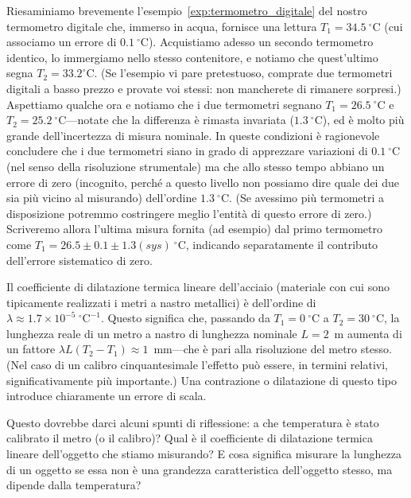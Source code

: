 \begin{examplebox}
  \begin{example}\label{exp:termometro_digitale_2}
    Riesaminiamo brevemente l'esempio~\ref{exp:termometro_digitale} del
    nostro termometro digitale che, immerso in acqua, fornisce una lettura
    $T_1 = 34.5~^\circ$C (cui associamo un errore di $0.1~^\circ$C). Acquistiamo
    adesso un secondo termometro identico, lo immergiamo nello stesso
    contenitore, e notiamo che quest'ultimo segna $T_2 = 33.2^\circ$C. (Se
    l'esempio vi pare pretestuoso, comprate due termometri digitali a basso
    prezzo e provate voi stessi: non mancherete di rimanere sorpresi.)
    Aspettiamo qualche ora e notiamo che i due termometri segnano
    $T_1 = 26.5~^\circ$C e $T_2 = 25.2~^\circ$C---notate che la differenza è
    rimasta invariata ($1.3~^\circ$C), ed è molto più grande dell'incertezza
    di misura nominale.
    In queste condizioni è ragionevole concludere che i due termometri siano
    in grado di apprezzare variazioni di $0.1~^\circ$C (nel senso della
    risoluzione strumentale) ma che allo stesso tempo abbiano un errore di zero
    (incognito, perché a questo livello non possiamo dire quale dei due sia
    più vicino al misurando) dell'ordine $1.3~^\circ$C.
    (Se avessimo più termometri a disposizione potremmo costringere meglio
    l'entità di questo errore di zero.) Scriveremo allora l'ultima misura
    fornita (ad esempio) dal primo termometro come
    $T_1 = 26.5 \pm 0.1 \pm 1.3 (sys)~^\circ$C, indicando separatamente il
    contributo dell'errore sistematico di zero.
  \end{example}

  \begin{example}\label{exp:dilatazione_termica}
    Il coefficiente di dilatazione termica lineare dell'acciaio (materiale con
    cui sono tipicamente realizzati i metri a nastro metallici) è dell'ordine
    di $\lambda \approx 1.7 \times 10^{-5}~{}^\circ\text{C}^{-1}$. Questo significa
    che, passando da $T_1 = 0~^\circ$C a $T_2 = 30~^\circ$C, la lunghezza
    reale di un metro a nastro di lunghezza nominale $L = 2$~m aumenta
    di un fattore $\lambda L (T_2 - T_1) \approx 1$~mm---che è pari alla
    risoluzione del metro stesso. (Nel caso di un calibro cinquantesimale
    l'effetto può essere, in termini relativi, significativamente più
    importante.) Una contrazione o dilatazione di questo tipo introduce
    chiaramente un errore di scala.

    Questo dovrebbe darci alcuni spunti di riflessione: a che temperatura è
    stato calibrato il metro (o il calibro)? Qual è il coefficiente di
    dilatazione termica lineare dell'oggetto che stiamo misurando? E cosa
    significa misurare la lunghezza di un oggetto se essa non è una grandezza
    caratteristica dell'oggetto stesso, ma dipende dalla temperatura?
  \end{example}
\end{examplebox}


